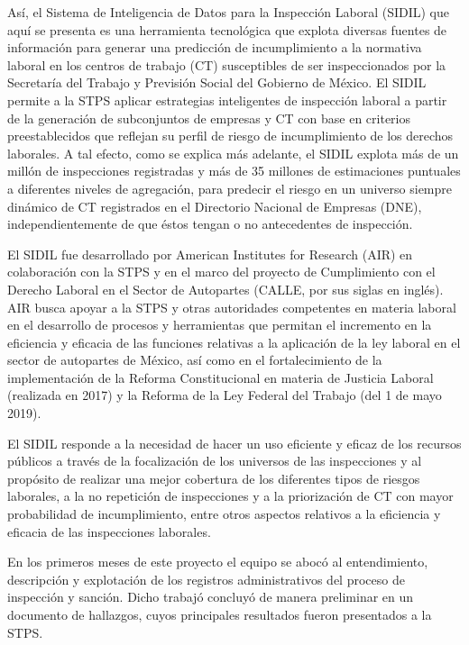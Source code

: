 \documentclass[
]{article}
\begin{document}
Así, el Sistema de Inteligencia de Datos para la Inspección Laboral (SIDIL) que aquí se presenta es una herramienta tecnológica que explota diversas fuentes de información para generar una predicción de incumplimiento a la normativa laboral en los centros de trabajo (CT) susceptibles de ser inspeccionados por la Secretaría del Trabajo y Previsión Social del Gobierno de México. El SIDIL permite a la STPS aplicar estrategias inteligentes de inspección laboral a partir de la generación de subconjuntos de empresas y CT con base en criterios preestablecidos que reflejan su perfil de riesgo de incumplimiento de los derechos laborales. A tal efecto, como se explica más adelante, el SIDIL explota más de un millón de inspecciones registradas y más de 35 millones de estimaciones puntuales a diferentes niveles de agregación, para predecir el riesgo en un universo siempre dinámico de CT registrados en el Directorio Nacional de Empresas (DNE), independientemente de que éstos tengan o no antecedentes de inspección.

El SIDIL fue desarrollado por American Institutes for Research (AIR) en colaboración con la STPS y en el marco del proyecto de Cumplimiento con el Derecho Laboral en el Sector de Autopartes (CALLE, por sus siglas en inglés). AIR busca apoyar a la STPS y otras autoridades competentes en materia laboral en el desarrollo de procesos y herramientas que permitan el incremento en la eficiencia y eficacia de las funciones relativas a la aplicación de la ley laboral en el sector de autopartes de México, así como en el fortalecimiento de la implementación de la Reforma Constitucional en materia de Justicia Laboral (realizada en 2017) y la Reforma de la Ley Federal del Trabajo (del 1 de mayo 2019).

El SIDIL responde a la necesidad de hacer un uso eficiente y eficaz de los recursos públicos a través de la focalización de los universos de las inspecciones y al propósito de realizar una mejor cobertura de los diferentes tipos de riesgos laborales, a la no repetición de inspecciones y a la priorización de CT con mayor probabilidad de incumplimiento, entre otros aspectos relativos a la eficiencia y eficacia de las inspecciones laborales.

En los primeros meses de este proyecto el equipo se abocó al entendimiento, descripción y explotación de los registros administrativos del proceso de inspección y sanción. Dicho trabajó concluyó de manera preliminar en un documento de hallazgos, cuyos principales resultados fueron presentados a la STPS.
\end{document}
